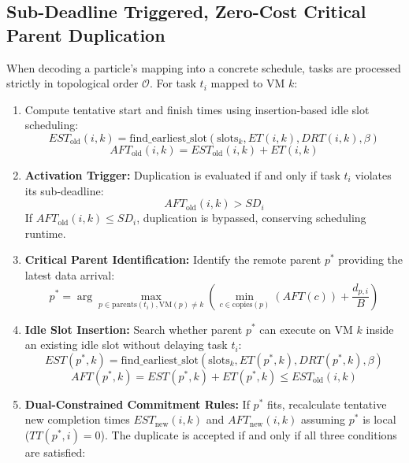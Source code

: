 \documentclass[journal]{IEEEtran}
\begin{document}
\subsection{Sub-Deadline Triggered, Zero-Cost Critical Parent Duplication}
When decoding a particle's mapping into a concrete schedule, tasks are processed strictly in topological order $\mathcal{O}$. For task $t_i$ mapped to VM $k$:
\begin{enumerate}
    \item Compute tentative start and finish times using insertion-based idle slot scheduling:
    \begin{equation}
    EST_{\text{old}}(i, k) = \text{find\_earliest\_slot}(\text{slots}_k, ET(i, k), DRT(i, k), \beta)
    \label{eq:est_old}
    \end{equation}
    \begin{equation}
    AFT_{\text{old}}(i, k) = EST_{\text{old}}(i, k) + ET(i, k)
    \label{eq:aft_old}
    \end{equation}
    \item \textbf{Activation Trigger:} Duplication is evaluated if and only if task $t_i$ violates its sub-deadline:
    \begin{equation}
    AFT_{\text{old}}(i, k) > SD_i
    \label{eq:trigger}
    \end{equation}
    If $AFT_{\text{old}}(i, k) \le SD_i$, duplication is bypassed, conserving scheduling runtime.
    \item \textbf{Critical Parent Identification:} Identify the remote parent $p^*$ providing the latest data arrival:
    \begin{equation}
    p^* = \arg\max_{p \in \text{parents}(t_i), \text{VM}(p) \ne k} \left( \min_{c \in \text{copies}(p)} (AFT(c)) + \frac{d_{p,i}}{B} \right)
    \label{eq:crit_parent}
    \end{equation}
    \item \textbf{Idle Slot Insertion:} Search whether parent $p^*$ can execute on VM $k$ inside an existing idle slot without delaying task $t_i$:
    \begin{equation}
    EST(p^*, k) = \text{find\_earliest\_slot}(\text{slots}_k, ET(p^*, k), DRT(p^*, k), \beta)
    \label{eq:est_parent}
    \end{equation}
    \begin{equation}
    AFT(p^*, k) = EST(p^*, k) + ET(p^*, k) \le EST_{\text{old}}(i, k)
    \label{eq:aft_parent}
    \end{equation}
    \item \textbf{Dual-Constrained Commitment Rules:} If $p^*$ fits, recalculate tentative new completion times $EST_{\text{new}}(i, k)$ and $AFT_{\text{new}}(i, k)$ assuming $p^*$ is local ($TT(p^*, i) = 0$). The duplicate is accepted if and only if all three conditions are satisfied:

\end{enumerate}
\end{document}
